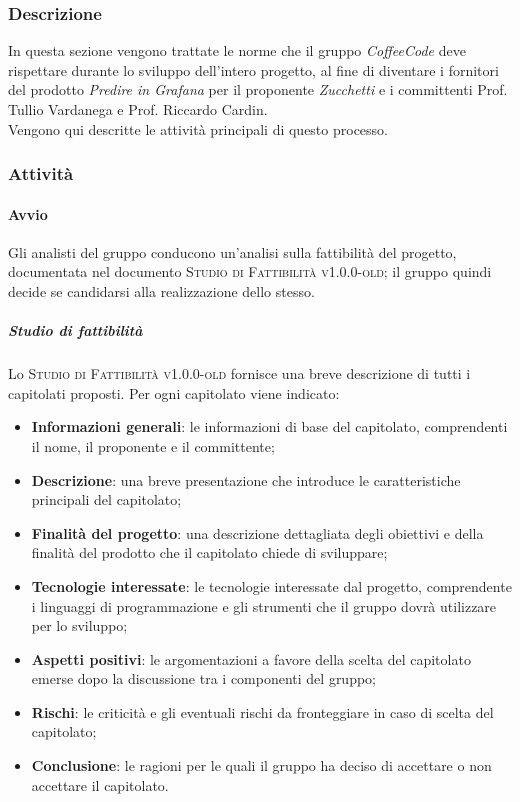 \documentclass[../norme-di-progetto.tex]{subfiles}
\begin{document}
\subsubsection{Descrizione}
In questa sezione vengono trattate le norme che il gruppo \emph{CoffeeCode} deve rispettare durante lo sviluppo dell'intero progetto, al fine di diventare i fornitori del prodotto \emph{Predire in Grafana} per il proponente \emph{Zucchetti} e i committenti Prof. Tullio Vardanega e Prof. Riccardo Cardin. \\
Vengono qui descritte le attività principali di questo processo.

\subsubsection{Attività}

\paragraph{Avvio}
Gli analisti del gruppo conducono un'analisi sulla fattibilità del progetto, documentata nel documento \textsc{Studio di Fattibilità v1.0.0-old}; il gruppo quindi decide se candidarsi alla realizzazione dello stesso.
\subparagraph*{Studio di fattibilità}
Lo \textsc{Studio di Fattibilità v1.0.0-old} fornisce una breve descrizione di tutti i capitolati proposti. Per ogni capitolato viene indicato:
\begin{itemize}
  \item \textbf{Informazioni generali}: le informazioni di base del capitolato, comprendenti il nome, il proponente e il committente;
  \item \textbf{Descrizione}: una breve presentazione che introduce le caratteristiche principali del capitolato;
  \item \textbf{Finalità del progetto}: una descrizione dettagliata degli obiettivi e della finalità del prodotto che il capitolato chiede di sviluppare;
  \item \textbf{Tecnologie interessate}: le tecnologie interessate dal progetto, comprendente i linguaggi di programmazione e gli strumenti che il gruppo dovrà utilizzare per lo sviluppo;
  \item \textbf{Aspetti positivi}: le argomentazioni a favore della scelta del capitolato emerse dopo la discussione tra i componenti del gruppo;
  \item \textbf{Rischi}: le criticità e gli eventuali rischi da fronteggiare in caso di scelta del capitolato;
  \item \textbf{Conclusione}: le ragioni per le quali il gruppo ha deciso di accettare o non accettare il capitolato.
\end{itemize}
\end{document}
